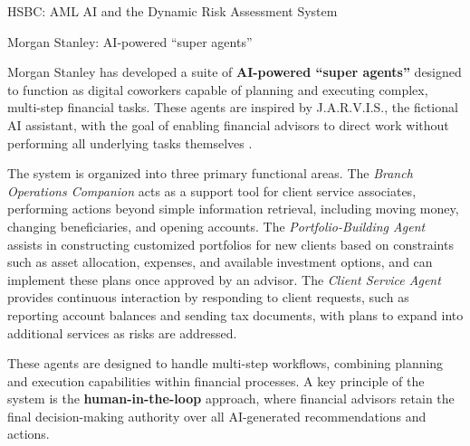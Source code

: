 \documentclass{article}
\begin{document}
\begin{usecasebox}{HSBC: AML AI and the Dynamic Risk Assessment System}
\end{usecasebox}

\begin{usecasebox}{Morgan Stanley: AI-powered “super agents”}

Morgan Stanley has developed a suite of \textbf{AI-powered “super agents”} designed to function as digital coworkers capable of planning and executing complex, multi-step financial tasks. These agents are inspired by J.A.R.V.I.S., the fictional AI assistant, with the goal of enabling financial advisors to direct work without performing all underlying tasks themselves \cite{finplanning_mswm2025}.

The system is organized into three primary functional areas. The \textit{Branch Operations Companion} acts as a support tool for client service associates, performing actions beyond simple information retrieval, including moving money, changing beneficiaries, and opening accounts. The \textit{Portfolio-Building Agent} assists in constructing customized portfolios for new clients based on constraints such as asset allocation, expenses, and available investment options, and can implement these plans once approved by an advisor. The \textit{Client Service Agent} provides continuous interaction by responding to client requests, such as reporting account balances and sending tax documents, with plans to expand into additional services as risks are addressed.

These agents are designed to handle multi-step workflows, combining planning and execution capabilities within financial processes. A key principle of the system is the \textbf{human-in-the-loop} approach, where financial advisors retain the final decision-making authority over all AI-generated recommendations and actions.


\end{usecasebox}
\end{document}
